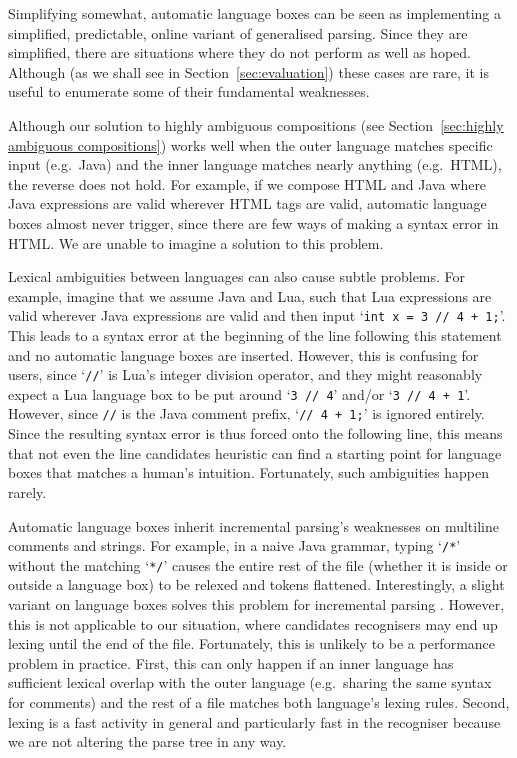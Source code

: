 \documentclass[sigplan,screen]{acmart}\settopmatter{printfolios=true,printccs=false,printacmref=false}
\begin{document}
Simplifying somewhat, automatic language boxes can be seen as implementing a
simplified, predictable, online variant of generalised parsing. Since they are
simplified, there are situations where they do not perform as well as hoped.
Although (as we shall see in Section~\ref{sec:evaluation}) these cases are
rare, it is useful to enumerate some of their fundamental weaknesses.

Although our solution to highly ambiguous compositions (see Section~\ref{sec:highly
ambiguous compositions}) works well when the outer language matches specific
input (e.g.~Java) and the inner language matches nearly anything (e.g.~HTML),
the reverse does not hold. For example, if we compose HTML and Java where
Java expressions are valid wherever HTML tags are valid, automatic language
boxes almost never trigger, since there are few ways of making a syntax error
in HTML. We are unable to imagine a solution to this problem.

Lexical ambiguities between languages can also cause subtle problems. For
example, imagine that we assume Java and Lua, such that Lua expressions are
valid wherever Java expressions are valid and then input `\texttt{int x = 3 //
4 + 1;}'. This leads to a syntax error at the beginning of the line following
this statement and no automatic language boxes are inserted. However, this is
confusing for users, since `\texttt{//}' is Lua's integer division operator,
and they might reasonably expect a Lua language box to be put around `\texttt{3
// 4}' and/or `\texttt{3 // 4 + 1}'. However, since \texttt{//} is the Java
comment prefix, `\texttt{// 4 + 1;}' is ignored entirely. Since the resulting
syntax error is thus forced onto the following line, this means that not even
the line candidates heuristic can find a starting point for language boxes that
matches a human's intuition. Fortunately, such ambiguities happen
rarely.

Automatic language boxes inherit incremental parsing's weaknesses on multiline
comments and strings. For example, in a naive Java grammar, typing
`\texttt{/*}' without the matching `\texttt{*/}' causes the entire rest of the
file (whether it is inside or outside a language box) to be relexed and tokens
flattened. Interestingly, a slight variant on language boxes solves this problem
for incremental parsing \cite[p.~108--122]{diekmann18editing}.
However, this is not applicable to our situation, where candidates
recognisers may end up lexing until the end of the file. Fortunately, this is
unlikely to be a performance problem in practice. First, this can only happen
if an inner language has sufficient lexical overlap with the outer language
(e.g.~sharing the same syntax for comments) and the rest of a file matches both
language's lexing rules.  Second, lexing is a fast activity in general and
particularly fast in the recogniser because we are not altering the parse tree
in any way.
\end{document}
